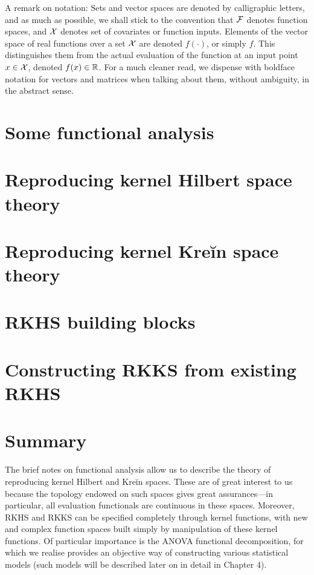\documentclass[a4paper,showframe,11pt]{report}
\begin{document}
A remark on notation: 
Sets and vector spaces are denoted by calligraphic letters, and as much as possible, we shall stick to the convention that ${\mathcal F}$ denotes function spaces, and ${\mathcal X}$ denotes set of covariates or function inputs. 
Elements of the vector space of real functions over a set ${\mathcal X}$ are denoted $f(\cdot)$, or simply $f$.
This distinguishes them from the actual evaluation of the function at an input point $x \in {\mathcal X}$, denoted $f(x) \in \mathbb{R}$.
For a much cleaner read, we dispense with boldface notation for vectors and matrices when talking about them, without ambiguity, in the abstract sense. 

\section{Some functional analysis}


\section{Reproducing kernel Hilbert space theory}\label{sec:rkhstheory}


\section{Reproducing kernel Kreĭn space theory}


\section{RKHS building blocks}


\section{Constructing RKKS from existing RKHS}\label{sec:constructrkks}


\section{Summary}

The brief notes on functional analysis allow us to describe the theory of reproducing kernel Hilbert and Kreĭn spaces.
These are of great interest to us because the topology endowed on such spaces gives great assurances---in particular, all evaluation functionals are continuous in these spaces.
Moreover, RKHS and RKKS can be specified completely through kernel functions, with new and complex function spaces built simply by manipulation of these kernel functions.
Of particular importance is the ANOVA functional decomposition, for which we realise provides an objective way of constructing various statistical models (such models will be described later on in detail in Chapter 4).
\end{document}
